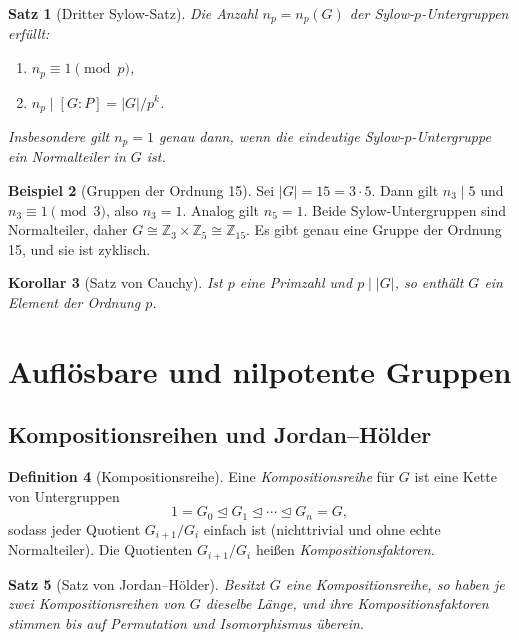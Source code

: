\documentclass[12pt,a4paper]{amsart}
\newtheorem{theorem}{Satz}[section]
\newtheorem{corollary}[theorem]{Korollar}
\theoremstyle{definition}
\newtheorem{definition}[theorem]{Definition}
\newtheorem{example}[theorem]{Beispiel}
\begin{document}
\begin{theorem}[Dritter Sylow-Satz]
\label{thm:sylow3}
Die Anzahl $n_p = n_p(G)$ der Sylow-$p$-Untergruppen erfüllt:
\begin{enumerate}[label=(\roman*)]
  \item $n_p \equiv 1 \pmod{p}$,
  \item $n_p \mid [G : P] = |G|/p^k$.
\end{enumerate}
Insbesondere gilt $n_p = 1$ genau dann, wenn die eindeutige Sylow-$p$-Untergruppe ein
Normalteiler in $G$ ist.
\end{theorem}

\begin{example}[Gruppen der Ordnung 15]
Sei $|G| = 15 = 3 \cdot 5$. Dann gilt $n_3 \mid 5$ und $n_3 \equiv 1 \pmod{3}$, also
$n_3 = 1$. Analog gilt $n_5 = 1$. Beide Sylow-Untergruppen sind Normalteiler, daher
$G \cong \mathbb{Z}_3 \times \mathbb{Z}_5 \cong \mathbb{Z}_{15}$. Es gibt genau eine
Gruppe der Ordnung 15, und sie ist zyklisch.
\end{example}

\begin{corollary}[Satz von Cauchy]
Ist $p$ eine Primzahl und $p \mid |G|$, so enthält $G$ ein Element der Ordnung $p$.
\end{corollary}

\section{Auflösbare und nilpotente Gruppen}
\label{sec:aufloesbar}

\subsection{Kompositionsreihen und Jordan--Hölder}

\begin{definition}[Kompositionsreihe]
Eine \emph{Kompositionsreihe} für $G$ ist eine Kette von Untergruppen
\[
  1 = G_0 \trianglelefteq G_1 \trianglelefteq \cdots \trianglelefteq G_n = G,
\]
sodass jeder Quotient $G_{i+1}/G_i$ einfach ist (nichttrivial und ohne echte Normalteiler).
Die Quotienten $G_{i+1}/G_i$ heißen \emph{Kompositionsfaktoren}.
\end{definition}

\begin{theorem}[Satz von Jordan--Hölder]
\label{thm:jordan_hoelder}
Besitzt $G$ eine Kompositionsreihe, so haben je zwei Kompositionsreihen von $G$ dieselbe
Länge, und ihre Kompositionsfaktoren stimmen bis auf Permutation und Isomorphismus überein.
\end{theorem}
\end{document}
